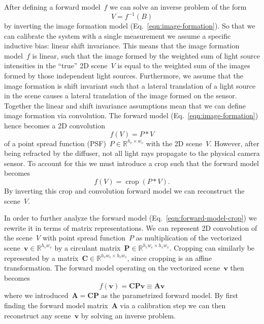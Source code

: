 \documentclass[final]{cvpr}
\begin{document}
After defining a forward model~$f$ we can solve an inverse problem of the form
\begin{equation}
	V = f^{-1}(B)
	\label{eqn:inverse-problem}
\end{equation}
by inverting the image formation model (Eq.~\ref{eqn:image-formation}).
So that we can calibrate the system with a single measurement we assume
a specific inductive bias: linear shift invariance.
This means that the image formation model~$f$ is linear, such that the image
formed by the weighted sum of light source intensities in the ``true'' 2D
scene~$V$ is equal to the weighted sum of the images formed by those
independent light sources.
Furthermore, we assume that the image formation is shift invariant such that
a lateral translation of a light source in the scene causes a lateral
translation of the image formed on the sensor.
Together the linear and shift invariance assumptions mean that we can define
image formation via convolution.
The forward model (Eq.~\ref{eqn:image-formation}) hence becomes a 2D
convolution
\begin{equation}
	f(V) = P * V
	\label{eqn:forward-model-convolution}
\end{equation}
of a point spread function (PSF)~$P\in\mathbb{R}^{h_v\times w_v}$ with the 2D
scene~$V$.
However, after being refracted by the diffuser, not all light rays propagate to
the physical camera sensor.
To account for this we must introduce a crop such that the forward model becomes
\begin{equation}
	f(V) = \operatorname*{crop}(P * V).
	\label{eqn:forward-model-crop}
\end{equation}
By inverting this crop and convolution forward model we can reconstruct the
scene~$V$.

In order to further analyze the forward model
(Eq.~\ref{eqn:forward-model-crop}) we rewrite it in terms of matrix
representations.
We can represent 2D convolution of the scene~$V$ with point spread function~$P$
as multiplication of the vectorized scene~$\mathbf{v}\in\mathbb{R}^{h_v w_v}$
by a circulant matrix~$\mathbf{P}\in\mathbb{R}^{h_c w_c\times h_v w_v}$.
Cropping can similarly be represented by a
matrix~$\mathbf{C}\in\mathbb{R}^{h_c w_c \times h_c w_c}$, since cropping is an
affine transformation.
The forward model operating on the vectorized scene~$\mathbf{v}$ then becomes
\begin{equation}
	f(\mathbf{v}) = \mathbf{C}\mathbf{P}\mathbf{v} \equiv \mathbf{A}\mathbf{v}
	\label{eqn:forward-model-vectorized}
\end{equation}
where we introduced~$\mathbf{A} = \mathbf{C}\mathbf{P}$ as the parametrized
forward model.
By first finding the forward model matrix~$\mathbf{A}$ via a calibration step
we can then reconstruct any scene~$\mathbf{v}$ by solving an inverse problem.
\end{document}
